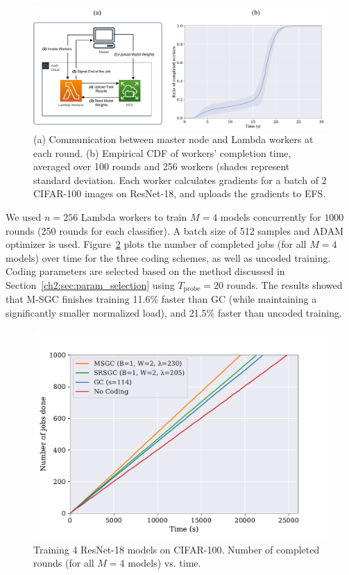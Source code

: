 \begin{figure}[!h]
    \centering
    \includegraphics[width=\textwidth]{figs/ch2/resnet_aws.pdf}
    \caption{ (a) Communication between master node and Lambda workers at each round. (b) Empirical CDF of workers’ completion time, averaged over 100 rounds and 256 workers (shades represent standard deviation. Each worker calculates gradients for a batch of 2 CIFAR-100 images on ResNet-18, and uploads the gradients to EFS.}
    \label{ch2:fig:resnet_aws}
\end{figure}


We used $n=256$ Lambda workers to train $M=4$ models concurrently for $1000$ rounds (250 rounds for each classifier). A batch size of 512 samples and ADAM optimizer is used. Figure~\ref{ch2:fig:resnet} plots the number of completed jobs (for all $M = 4$ models) over time for the three coding schemes, as well as uncoded training. Coding parameters are selected based on the method discussed in Section~\ref{ch2:sec:param_selection} using $T_\text{probe}=20$ rounds. The results showed that M-SGC finishes training 11.6\% faster than GC (while maintaining a significantly smaller normalized load), and 21.5\% faster than uncoded training.

\begin{figure}[!h]
    \centering
    \includegraphics[width=.8\textwidth]{figs/ch2/resnet_numrounds.pdf}
    \caption{ Training 4 ResNet-18 models on CIFAR-100. Number of completed rounds (for all $M=4$ models) vs. time.}
    \label{ch2:fig:resnet}
\end{figure}

